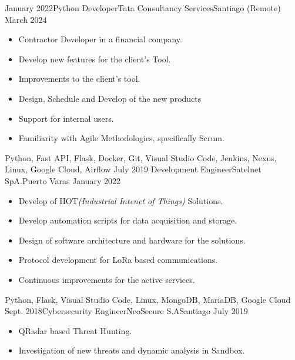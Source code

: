 %
%
%

\begin{experiences}
  \experience
    {January 2022}{Python Developer}{Tata Consultancy Services}{Santiago (Remote)}
    {March 2024} 
    {
      \begin{itemize}
        \item Contractor Developer in a financial company.
        \item Develop new features for the client's Tool.
        \item Improvements to the client's tool.
        \item Design, Schedule and Develop of the new products
        \item Support for internal users.
        \item Familiarity with Agile Methodologies, specifically Scrum.
      \end{itemize}
    }{Python, Fast API, Flask, Docker, Git, Visual Studio Code, Jenkins, Nexus, Linux, Google Cloud, Airflow}
  \emptySeparator
  \experience
    {July 2019} {Development Engineer}{Satelnet SpA.}{Puerto Varas}
    {January 2022}    
    {
      \begin{itemize}
        \item Develop of IIOT{\it (Industrial Intenet of Things)} Solutions.
        \item Develop automation scripts for data acquisition and storage.
        \item Design of software architecture and hardware for the solutions.
        \item Protocol development for LoRa based communications.
        \item Continuous improvements for the active services.                           
      \end{itemize}
    }{Python, Flask, Visual Studio Code, Linux, MongoDB, MariaDB, Google Cloud}
  \emptySeparator
  \experience
    {Sept. 2018}{Cybersecurity Engineer}{NeoSecure S.A}{Santiago}
    {July 2019}    
    {
      \begin{itemize}
        \item QRadar based Threat Hunting.
        \item Investigation of new threats and dynamic analysis in Sandbox.              

\end{itemize}}
\end{experiences}
